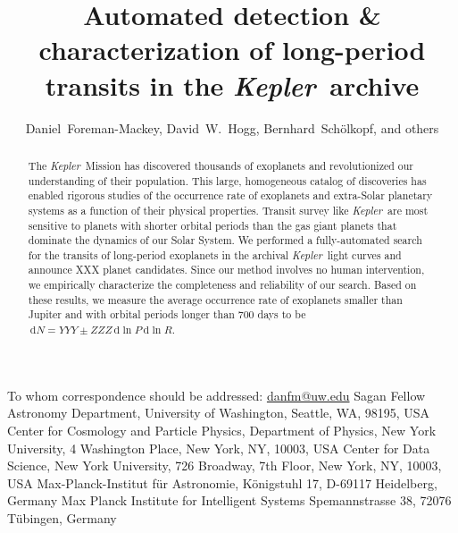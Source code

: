 \documentclass[12pt,preprint]{aastex}
\newcommand{\project}[1]{\textsl{#1}}
\newcommand{\kepler}{\project{Kepler}}
\newcommand{\dd}{\ensuremath{\,\mathrm{d}}}
\begin{document}
\title{%
Automated detection \& characterization of long-period transits in the
\kepler\ archive
}

\newcommand{\uw}{3}
\newcommand{\nyu}{4}
\newcommand{\cds}{5}
\newcommand{\mpia}{6}
\newcommand{\mpis}{7}
\author{%
    Daniel~Foreman-Mackey\altaffilmark{1,2,\uw},
    David~W.~Hogg\altaffilmark{\nyu,\mpia,\cds},
    Bernhard~Sch\"olkopf\altaffilmark{\mpis},
    and others
}
         {To whom correspondence should be addressed:
                          \url{danfm@uw.edu}}
         {Sagan Fellow}
\altaffiltext{\uw}       {Astronomy Department, University of Washington,
                          Seattle, WA, 98195, USA}
\altaffiltext{\nyu}      {Center for Cosmology and Particle Physics,
                          Department of Physics, New York University,
                          4 Washington Place, New York, NY, 10003, USA}
\altaffiltext{\cds}      {Center for Data Science, New York University,
                          726 Broadway, 7th Floor, New York, NY, 10003, USA}
\altaffiltext{\mpia}     {Max-Planck-Institut f\"ur Astronomie,
                          K\"onigstuhl 17, D-69117 Heidelberg, Germany}
\altaffiltext{\mpis}     {Max Planck Institute for Intelligent Systems
                          Spemannstrasse 38, 72076 T\"ubingen, Germany}

\begin{abstract}

The \kepler\ Mission has discovered thousands of exoplanets and revolutionized
our understanding of their population.
This large, homogeneous catalog of discoveries has enabled rigorous studies of
the occurrence rate of exoplanets and extra-Solar planetary systems as a
function of their physical properties.
Transit survey like \kepler\ are most sensitive to planets with shorter
orbital periods than the gas giant planets that dominate the dynamics of our
Solar System.
We performed a fully-automated search for the transits of long-period
exoplanets in the archival \kepler\ light curves and announce XXX planet
candidates.
Since our method involves no human intervention, we empirically characterize
the completeness and reliability of our search.
Based on these results, we measure the average occurrence rate of exoplanets
smaller than Jupiter and with orbital periods longer than 700 days to be $\dd
N = YYY \pm ZZZ\dd \ln P \dd \ln R$.

\end{abstract}

\end{document}
